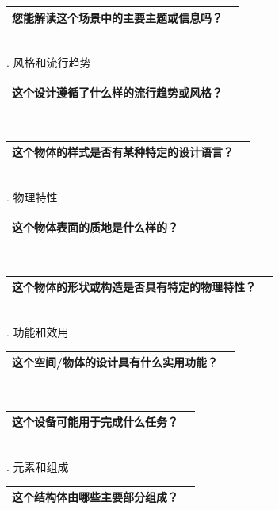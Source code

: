 \documentclass[12pt]{book}
\begin{document}
\begin{tabular}{|p{15cm}|p{3cm}|}
	\hline
您能解读这个场景中的主要主题或信息吗？\\
	\hline
\end{tabular}\\

. 风格和流行趋势

\begin{tabular}{|p{15cm}|p{3cm}|}
	\hline
这个设计遵循了什么样的流行趋势或风格？\\
	\hline
\end{tabular}\\



\begin{tabular}{|p{15cm}|p{3cm}|}
	\hline
这个物体的样式是否有某种特定的设计语言？\\
	\hline
\end{tabular}\\



. 物理特性

\begin{tabular}{|p{15cm}|p{3cm}|}
	\hline
这个物体表面的质地是什么样的？\\
	\hline
\end{tabular}\\



\begin{tabular}{|p{15cm}|p{3cm}|}
	\hline
这个物体的形状或构造是否具有特定的物理特性？\\
	\hline
\end{tabular}\\


. 功能和效用

\begin{tabular}{|p{15cm}|p{3cm}|}
	\hline
这个空间/物体的设计具有什么实用功能？\\
	\hline
\end{tabular}\\



\begin{tabular}{|p{15cm}|p{3cm}|}
	\hline
这个设备可能用于完成什么任务？\\
	\hline
\end{tabular}\\


. 元素和组成

\begin{tabular}{|p{15cm}|p{3cm}|}
	\hline
这个结构体由哪些主要部分组成？\\
	\hline
\end{tabular}\\
\end{document}
